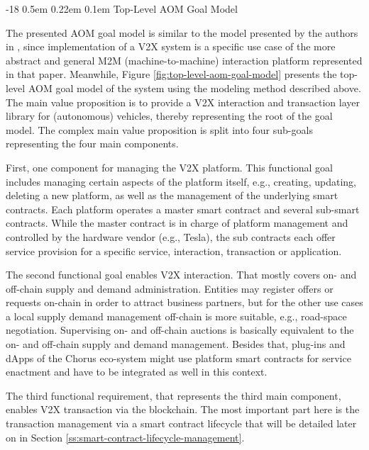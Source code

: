 \documentclass{llncs}
\makeatletter
\renewcommand\subsubsection{\@startsection{subsubsection}{3}{\z@}%
		{-18\p@ \@plus -4\p@ \@minus -4\p@}%
		{0.5em \@plus 0.22em \@minus 0.1em}%
		{\normalfont\normalsize\bfseries\boldmath}}
\makeatother
\begin{document}
{			
					
			\subsubsection{Top-Level AOM Goal Model}
				\label{sss:top-level-goal-model}
				
				The presented AOM goal model is similar to the model presented by the authors in \cite{leidingM2M}, since implementation of a V2X system is a specific use case of the more abstract and general M2M (machine-to-machine) interaction platform represented in that paper. Meanwhile, Figure \ref{fig:top-level-aom-goal-model} presents the top-level AOM goal model of the system using the modeling method described above. The main value proposition is to provide a V2X interaction and transaction layer library for (autonomous) vehicles, thereby representing the root of the goal model. The complex main value proposition is split into four sub-goals representing the four main components.
				
				First, one component for managing the V2X platform. This functional goal includes managing certain aspects of the platform itself, e.g., creating, updating, deleting a new platform, as well as the management of the underlying smart contracts. Each platform operates a master smart contract and several sub-smart contracts. While the master contract is in charge of platform management and controlled by the hardware vendor (e.g., Tesla), the sub contracts each offer service provision for a specific service, interaction, transaction or application.
				
				The second functional goal enables V2X interaction. That mostly covers on- and off-chain supply and demand administration. Entities may register offers or requests on-chain in order to attract business partners, but for the other use cases a local supply demand management off-chain is more suitable, e.g., road-space negotiation. Supervising on- and off-chain auctions is basically equivalent to the on- and off-chain supply and demand management. Besides that, plug-ins and dApps of the Chorus eco-system might use platform smart contracts for service enactment and have to be integrated as well in this context.
				
				The third functional requirement, that represents the third main component, enables V2X transaction via the blockchain. The most important part here is the transaction management via a smart contract lifecycle that will be detailed later on in Section \ref{ss:smart-contract-lifecycle-management}.
				
}
\end{document}
